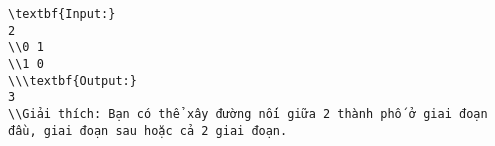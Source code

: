 \begin{verbatim}
\textbf{Input:}
2
\\0 1
\\1 0
\\\textbf{Output:}
3
\\Giải thích: Bạn có thể xây đường nối giữa 2 thành phố ở giai đoạn đầu, giai đoạn sau hoặc cả 2 giai đoạn.\end{verbatim}